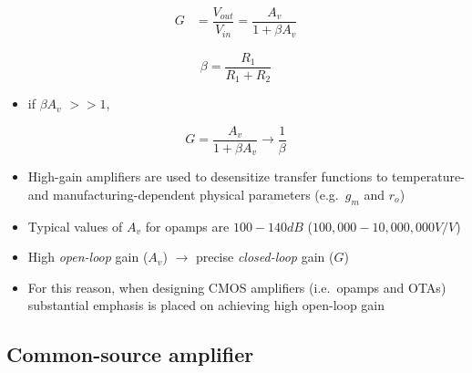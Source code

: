 \documentclass[11pt]{article}
\providecommand{\tightlist}{%
      \setlength{\itemsep}{0pt}\setlength{\parskip}{0pt}}
\begin{document}
    \begin{align}
G &= \dfrac{V_{out}}{V_{in}} = \dfrac{A_v}{1+\beta A_v}
\end{align}

\begin{equation}
\beta = \dfrac{R_1}{R_1+R_2}
\end{equation}

\begin{itemize}
\tightlist
\item
  if \(\beta A_v\) \(>> 1\),
\end{itemize}

\begin{equation}
G = \dfrac{A_v}{1+\beta A_v} \rightarrow \dfrac{1}{\beta}
\end{equation}

    \begin{itemize}
\tightlist
\item
  High-gain amplifiers are used to desensitize transfer functions to
  temperature- and manufacturing-dependent physical parameters
  (e.g.~\(g_m\) and \(r_o\))
\item
  Typical values of \(A_v\) for opamps are \(100 - 140 dB\)
  (\(100,000 - 10,000,000 V/V\))
\item
  High \emph{open-loop} gain (\(A_v\)) \(\rightarrow\) precise
  \emph{closed-loop} gain (\(G\))
\item
  For this reason, when designing CMOS amplifiers (i.e.~opamps and OTAs)
  substantial emphasis is placed on achieving high open-loop gain
\end{itemize}

    \hypertarget{common-source-amplifier}{%
\subsection{Common-source amplifier}\label{common-source-amplifier}}
\end{document}
